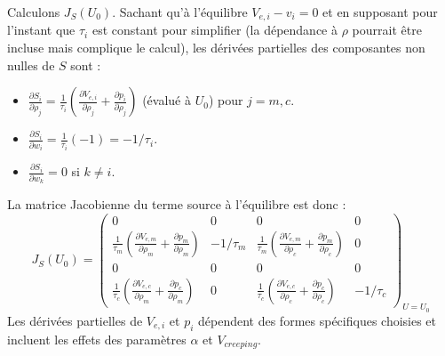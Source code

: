 Calculons \( J_S(U_0) \). Sachant qu'à l'équilibre \( V_{e,i} - v_i = 0 \) et en supposant pour l'instant que \( \tau_i \) est constant pour simplifier (la dépendance à \( \rho \) pourrait être incluse mais complique le calcul), les dérivées partielles des composantes non nulles de \( S \) sont :
\begin{itemize}
    \item \( \frac{\partial S_i}{\partial \rho_j} = \frac{1}{\tau_i} \left( \frac{\partial V_{e,i}}{\partial \rho_j} + \frac{\partial p_i}{\partial \rho_j} \right) \) (évalué à \( U_0 \)) pour \( j = m, c \).
    \item \( \frac{\partial S_i}{\partial w_i} = \frac{1}{\tau_i} (-1) = -1/\tau_i \).
    \item \( \frac{\partial S_i}{\partial w_k} = 0 \) si \( k \neq i \).
\end{itemize}
La matrice Jacobienne du terme source à l'équilibre est donc :
\[
J_S(U_0) =
\begin{pmatrix}
 0 & 0 & 0 & 0 \\
 \frac{1}{\tau_m}(\frac{\partial V_{e,m}}{\partial \rho_m} + \frac{\partial p_m}{\partial \rho_m}) & -1/\tau_m & \frac{1}{\tau_m}(\frac{\partial V_{e,m}}{\partial \rho_c} + \frac{\partial p_m}{\partial \rho_c}) & 0 \\
 0 & 0 & 0 & 0 \\
 \frac{1}{\tau_c}(\frac{\partial V_{e,c}}{\partial \rho_m} + \frac{\partial p_c}{\partial \rho_m}) & 0 & \frac{1}{\tau_c}(\frac{\partial V_{e,c}}{\partial \rho_c} + \frac{\partial p_c}{\partial \rho_c}) & -1/\tau_c
\end{pmatrix}_{U=U_0}
\]
Les dérivées partielles de \( V_{e,i} \) et \( p_i \) dépendent des formes spécifiques choisies et incluent les effets des paramètres \( \alpha \) et \( V_{creeping} \).

